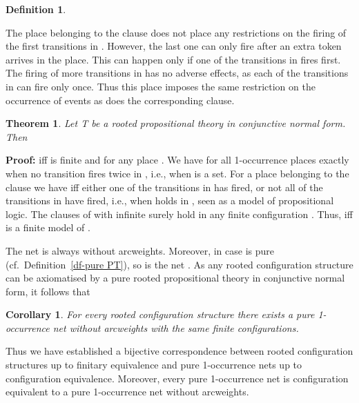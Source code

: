 \documentclass[twocolumn]{article}
\newtheorem{defi}{Definition}[section]
\newtheorem{theo}{Theorem}
\newtheorem{coro}{Corollary}
\newenvironment{definition}[1]{\begin{defi} \rm \label{df-#1} }{\end{defi}}
\newenvironment{theorem}[1]{\begin{theo} \rm \label{th-#1} }{\end{theo}}
\newenvironment{corollary}[1]{\begin{coro} \rm \label{cor-#1} }{\end{coro}}
\newenvironment{proof}{\begin{trivlist} \item[\hspace{\labelsep}\bf
Proof:]}{\hfill \end{trivlist}}
\newcommand{\df}[1]{Definition~\ref{df-#1}}
\begin{document}
\begin{definition}{TtoN}
{{    \hbox{\vrule depth0.984in width0pt height 0pt}\kern 1.732in
  }} 
\end{definition}
The place belonging to the clause  does not place any
restrictions on the firing of the first \mbox{} transitions in
.  However, the last one can only fire after an extra token arrives
in the place.  This can happen only if one of the transitions in 
fires first.  The firing of more transitions in  has no adverse
effects, as each of the transitions in  can fire only once.  Thus
this place imposes the same restriction on the occurrence of events as
does the corresponding clause.

\begin{theorem}{PtoNtoC}
Let T be a rooted propositional theory in conjunctive normal
form. Then 
\end{theorem}

\begin{proof}
 iff  is finite and  for any
place . We have  for all 1-occurrence places 
exactly when no transition fires twice in , i.e., when  is a set.
For a place  belonging to the clause  we have
 iff either one of the transitions in  has fired, or
not all of the transitions in  have fired, i.e., when 
holds in , seen as a model of propositional logic. The clauses
 of  with  infinite surely hold in any finite
configuration .
Thus,  iff  is a finite model of .
\end{proof}
The net  is always without arcweights.
Moreover, in case  is pure (cf.\ \df{pure PT}), so is the net
. As any rooted configuration structure can be axiomatised
by a pure rooted propositional theory in conjunctive normal form,
it follows that
\begin{corollary}{CtoN}
For every rooted configuration structure there exists a pure
1-occurrence net without arcweights with the same finite configurations.
\hfill 
\end{corollary}
Thus we have established a bijective correspondence between rooted
configuration structures up to finitary equivalence and pure
1-oc\-cur\-rence nets up to configuration equivalence.
Moreover, every pure 1-occurrence net is configuration
equivalent to a pure 1-occurrence net without arcweights.
\end{document}
